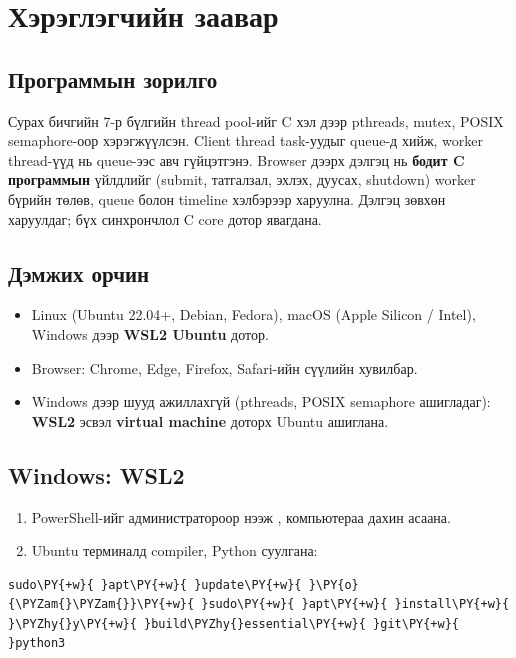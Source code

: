 \documentclass[12pt,a4paper]{article}
\begin{document}

\tableofcontents
\clearpage

\section{Хэрэглэгчийн заавар}

\subsection{Программын зорилго}

Сурах бичгийн 7-р бүлгийн thread pool-ийг C хэл дээр pthreads, mutex, POSIX semaphore-оор хэрэгжүүлсэн. Client thread task-уудыг queue-д хийж, worker thread-үүд нь queue-ээс авч гүйцэтгэнэ. Browser дээрх дэлгэц нь \textbf{бодит C программын} үйлдлийг (submit, татгалзал, эхлэх, дуусах, shutdown) worker бүрийн төлөв, queue болон timeline хэлбэрээр харуулна. Дэлгэц зөвхөн харуулдаг; бүх синхрончлол C core дотор явагдана.

\subsection{Дэмжих орчин}

\begin{itemize}
  \item Linux (Ubuntu 22.04+, Debian, Fedora), macOS (Apple Silicon / Intel), Windows дээр \textbf{WSL2 Ubuntu} дотор.
  \item Browser: Chrome, Edge, Firefox, Safari-ийн сүүлийн хувилбар.
  \item Windows дээр шууд ажиллахгүй (pthreads, POSIX semaphore ашигладаг): \textbf{WSL2} эсвэл \textbf{virtual machine} доторх Ubuntu ашиглана.
\end{itemize}

\subsection{Windows: WSL2}

\begin{enumerate}
  \item PowerShell-ийг администратороор нээж , компьютераа дахин асаана.
  \item Ubuntu терминалд compiler, Python суулгана:
\end{enumerate}

\par\noindent\begin{minipage}{\linewidth}\setlength{\topsep}{1pt}\setlength{\partopsep}{0pt}
\begin{Verbatim}[commandchars=\\\{\}]
sudo\PY{+w}{ }apt\PY{+w}{ }update\PY{+w}{ }\PY{o}{\PYZam{}\PYZam{}}\PY{+w}{ }sudo\PY{+w}{ }apt\PY{+w}{ }install\PY{+w}{ }\PYZhy{}y\PY{+w}{ }build\PYZhy{}essential\PY{+w}{ }git\PY{+w}{ }python3
\end{Verbatim}
\end{minipage}
\end{document}

